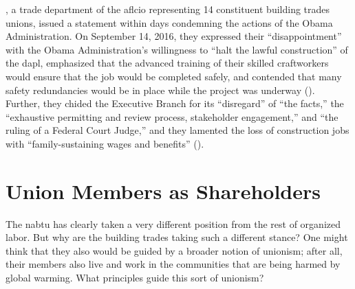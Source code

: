 
, a trade department of the \acrshort{aflcio} representing 14 constituent building trades unions, issued a statement within days condemning the actions of the Obama Administration. On September 14, 2016, they expressed their “disappointment” with the Obama Administration's willingness to “halt the lawful construction” of the \acrshort{dapl}, emphasized that the advanced training of their skilled craftworkers would ensure that the job would be completed safely, and contended that many safety redundancies would be in place while the project was underway  (\cite{nabtuStatementObamaAdministration2016}). Further, they chided the Executive Branch for its “disregard” of “the facts,” the “exhaustive permitting and review process, stakeholder engagement,” and “the ruling of a Federal Court Judge,” and they lamented the loss of construction jobs with “family-sustaining wages and benefits” (\cite{nabtuStatementObamaAdministration2016}).


\section{Union Members as Shareholders}\label{union_shareholders}

The \acrshort{nabtu} has clearly taken a very different position from the rest of organized labor. But why are the building trades taking such a different stance? One might think that they also would be guided by a broader notion of unionism; after all, their members also live and work in the communities that are being harmed by global warming. What principles guide this sort of unionism?

